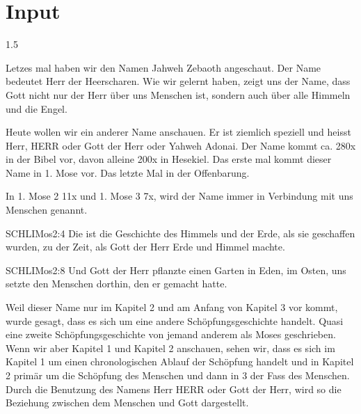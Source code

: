 \documentclass[fontsize=14pt]{../../inc/mybib}
\begin{document}
\section{ Input }
\begin{spacing}{1.5}
    \begin{block}
        Letzes mal haben wir den Namen Jahweh Zebaoth angeschaut. Der Name bedeutet Herr der Heerscharen. Wie wir gelernt haben, zeigt uns der Name, dass Gott nicht nur der Herr über uns Menschen ist, sondern auch über alle Himmeln und die Engel.

        Heute wollen wir ein anderer Name anschauen. Er ist ziemlich speziell und heisst Herr, HERR oder Gott der Herr oder Yahweh Adonai. Der Name kommt ca. 280x in der Bibel vor, davon alleine 200x in Hesekiel. Das erste mal kommt dieser Name in 1. Mose vor. Das letzte Mal in der Offenbarung.

        In 1. Mose 2 11x und 1. Mose 3 7x, wird der Name immer in Verbindung mit uns Menschen genannt.
        \begin{bibelbox}{SCHL}{IMos}{2:4}
            Die ist die Geschichte des Himmels und der Erde, als sie geschaffen wurden, zu der Zeit, als Gott der Herr Erde und Himmel machte.
        \end{bibelbox}
        \begin{bibelbox}{SCHL}{IMos}{2:8}
            Und Gott der Herr pflanzte einen Garten in Eden, im Osten, uns setzte den Menschen dorthin, den er gemacht hatte.
        \end{bibelbox}
        Weil dieser Name nur im Kapitel 2 und am Anfang von Kapitel 3 vor kommt, wurde gesagt, dass es sich um eine andere Schöpfungsgeschichte handelt. Quasi eine zweite Schöpfungsgeschichte von jemand anderem als Moses geschrieben. Wenn wir aber Kapitel 1 und Kapitel 2 anschauen, sehen wir, dass es sich im Kapitel 1 um einen chronologischen Ablauf der Schöpfung handelt und in Kapitel 2 primär um die Schöpfung des Menschen und dann in 3 der Fass des Menschen. Durch die Benutzung des Namens Herr HERR oder Gott der Herr, wird so die Beziehung zwischen dem Menschen und Gott dargestellt.


\end{block}
\end{spacing}
\end{document}
